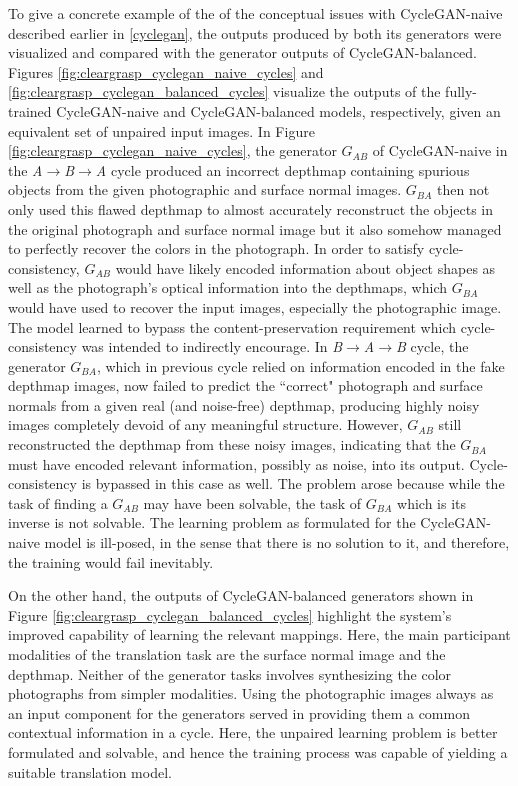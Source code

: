 To give a concrete example of the of the conceptual issues with CycleGAN-naive described earlier in \ref{cyclegan}, the outputs produced by both its generators were visualized and compared with the generator outputs of CycleGAN-balanced. Figures \ref{fig:cleargrasp_cyclegan_naive_cycles} and \ref{fig:cleargrasp_cyclegan_balanced_cycles} visualize the outputs of the fully-trained CycleGAN-naive and CycleGAN-balanced models, respectively, given an equivalent set of unpaired input images. In Figure \ref{fig:cleargrasp_cyclegan_naive_cycles}, the generator $G_{AB}$ of CycleGAN-naive in the \textit{A}$\rightarrow$\textit{B}$\rightarrow$\textit{A} cycle produced an incorrect depthmap containing spurious objects from the given photographic and surface normal images. $G_{BA}$ then not only used this flawed depthmap to almost accurately reconstruct the objects in the original photograph and surface normal image but it also somehow managed to perfectly recover the colors in the photograph. In order to satisfy cycle-consistency, $G_{AB}$ would have likely encoded information about object shapes as well as the photograph's optical information into the depthmaps, which $G_{BA}$ would have used to recover the input images, especially the photographic image. The model learned to bypass the content-preservation requirement which cycle-consistency was intended to indirectly encourage. In \textit{B}$\rightarrow$\textit{A}$\rightarrow$\textit{B} cycle, the generator $G_{BA}$, which in previous cycle relied on information encoded in the fake depthmap images, now failed to predict the ``correct" photograph and surface normals from a given real (and noise-free) depthmap, producing highly noisy images completely devoid of any meaningful structure. However, $G_{AB}$ still reconstructed the depthmap from these noisy images, indicating that the $G_{BA}$ must have encoded relevant information, possibly as noise, into its output. Cycle-consistency is bypassed in this case as well. The problem arose because while the task of finding a $G_{AB}$ may have been solvable, the task of $G_{BA}$ which is its inverse is not solvable. The learning problem as formulated for the CycleGAN-naive model is ill-posed, in the sense that there is no solution to it, and therefore, the training would fail inevitably. 

On the other hand, the outputs of CycleGAN-balanced generators shown in Figure \ref{fig:cleargrasp_cyclegan_balanced_cycles} highlight the system's improved capability of learning the relevant mappings. Here, the main participant modalities of the translation task are the surface normal image and the depthmap. Neither of the generator tasks involves synthesizing the color photographs from simpler modalities. Using the photographic images always as an input component for the generators served in providing them a common contextual information in a cycle. Here, the unpaired learning problem is better formulated and solvable, and hence the training process was capable of yielding a suitable translation model.




